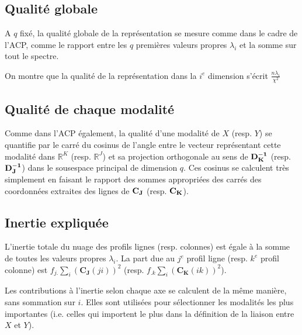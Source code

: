 \documentclass[letterpaper,10pt,french]{sphinxmanual}
\begin{document}
\subsection{Qualité globale}
\label{\detokenize{afc:qualite-globale}}
\sphinxAtStartPar
A \(q\) fixé, la qualité globale de la représentation se mesure comme dans le cadre de l’ACP, comme le rapport entre les \(q\) premières valeurs propres \(\lambda_i\) et la somme sur tout le spectre.

\sphinxAtStartPar
On montre que la qualité de la représentation dans la \(i^e\) dimension s’écrit \(\frac{n\lambda_i}{\chi^2}\)


\subsection{Qualité de chaque modalité}
\label{\detokenize{afc:qualite-de-chaque-modalite}}
\sphinxAtStartPar
Comme dans l’ACP également, la qualité d’une modalité de \(X\) (resp. \(Y\)) se quantifie par le carré du cosinus de l’angle entre le vecteur représentant cette modalité dans \(\mathbb{R}^K\) (resp. \(\mathbb{R}^J\))  et sa projection orthogonale au sens de \({\bf D_K^{-1}}\) (resp. \({\bf D_J^{-1}}\)) dans le sous\sphinxhyphen{}espace principal de dimension \(q\). Ces cosinus se calculent très simplement en faisant le rapport des sommes appropriées des carrés des coordonnées extraites des lignes de \({\bf C_J}\) (resp. \({\bf C_K}\)).


\subsection{Inertie expliquée}
\label{\detokenize{afc:inertie-expliquee}}
\sphinxAtStartPar
L’inertie totale du nuage des profils lignes (resp. colonnes) est égale à la somme de toutes les valeurs propres \(\lambda_i\). La part due au \(j^e\) profil ligne (resp. \(k^e\) profil colonne) est \(f_{j.}\displaystyle\sum_i \left (\mathbf{C_J}(ji) \right )^2\) (resp. \(f_{.k}\displaystyle\sum_i \left (\mathbf{C_K}(ik) \right )^2\)).

\sphinxAtStartPar
Les contributions à l’inertie selon chaque axe se calculent de la même manière, sans sommation sur \(i\). Elles sont utilisées pour sélectionner les modalités les plus importantes (i.e. celles qui importent le plus dans la définition de la liaison entre \(X\) et \(Y\)).
\end{document}
